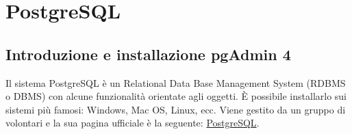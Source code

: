 \documentclass[a4paper]{article}
\begin{document}
	\newpage
	\section{PostgreSQL}
	
	\subsection{Introduzione e installazione pgAdmin 4}
	
	Il sistema PostgreSQL è un Relational Data Base Management System (RDBMS o DBMS) con alcune funzionalità orientate agli oggetti. È possibile installarlo sui sistemi più famosi: Windows, Mac OS, Linux, ecc. Viene gestito da un gruppo di volontari e la sua pagina ufficiale è la seguente: \href{https://www.postgresql.org/}{PostgreSQL}.\newline
	
\end{document}
